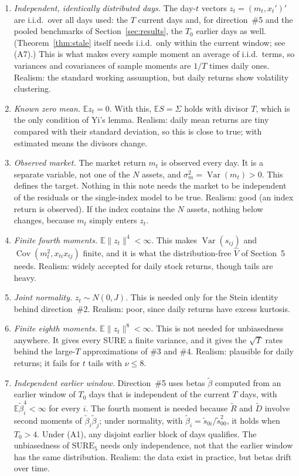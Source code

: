 \documentclass[11pt]{article}
\theoremstyle{remark}
\begin{document}
\begin{enumerate}
  \item[(A1)] \emph{Independent, identically distributed days.} The day-$t$ vectors $z_t = (m_t, x_t')'$ are i.i.d.\ over all days used: the $T$ current days and, for direction~\#5 and the pooled benchmarks of Section~\ref{sec:results}, the $T_0$ earlier days as well. (Theorem~\ref{thm:stale} itself needs i.i.d.\ only within the current window; see (A7).) This is what makes every sample moment an average of i.i.d.\ terms, so variances and covariances of sample moments are $1/T$ times daily ones. Realism: the standard working assumption, but daily returns show volatility clustering.
  \item[(A2)] \emph{Known zero mean.} $\mathbb{E}z_t = 0$. With this, $\mathbb{E}S = \Sigma$ holds with divisor $T$, which is the only condition of Yi's lemma. Realism: daily mean returns are tiny compared with their standard deviation, so this is close to true; with estimated means the divisors change.
  \item[(A3)] \emph{Observed market.} The market return $m_t$ is observed every day. It is a separate variable, not one of the $N$ assets, and $\sigma_m^2 = \operatorname{Var}(m_t) > 0$. This defines the target. Nothing in this note needs the market to be independent of the residuals or the single-index model to be true. Realism: good (an index return is observed). If the index contains the $N$ assets, nothing below changes, because $m_t$ simply enters $z_t$.
  \item[(A4)] \emph{Finite fourth moments.} $\mathbb{E}\|z_t\|^4 < \infty$. This makes $\operatorname{Var}(s_{ij})$ and $\operatorname{Cov}(m_t^2, x_{ti}x_{tj})$ finite, and it is what the distribution-free $\hat V$ of Section~5 needs. Realism: widely accepted for daily stock returns, though tails are heavy.
  \item[(A5)] \emph{Joint normality.} $z_t \sim N(0, J)$. This is needed only for the Stein identity behind direction~\#2. Realism: poor, since daily returns have excess kurtosis.
  \item[(A6)] \emph{Finite eighth moments.} $\mathbb{E}\|z_t\|^8 < \infty$. This is not needed for unbiasedness anywhere. It gives every SURE a finite variance, and it gives the $\sqrt T$ rates behind the large-$T$ approximations of \#3 and \#4. Realism: plausible for daily returns; it fails for $t$ tails with $\nu \le 8$.
  \item[(A7)] \emph{Independent earlier window.} Direction~\#5 uses betas $\tilde\beta$ computed from an earlier window of $T_0$ days that is independent of the current $T$ days, with $\mathbb{E}\tilde\beta_i^4 < \infty$ for every $i$. The fourth moment is needed because $\tilde R$ and $\tilde D$ involve second moments of $\tilde\beta_i\tilde\beta_j$; under normality, with $\tilde\beta_i = \tilde s_{0i}/\tilde s_{00}^2$, it holds when $T_0 > 4$. Under (A1), any disjoint earlier block of days qualifies. The unbiasedness of $\mathrm{SURE}_5$ needs only independence, not that the earlier window has the same distribution. Realism: the data exist in practice, but betas drift over time.

\end{enumerate}
\end{document}
